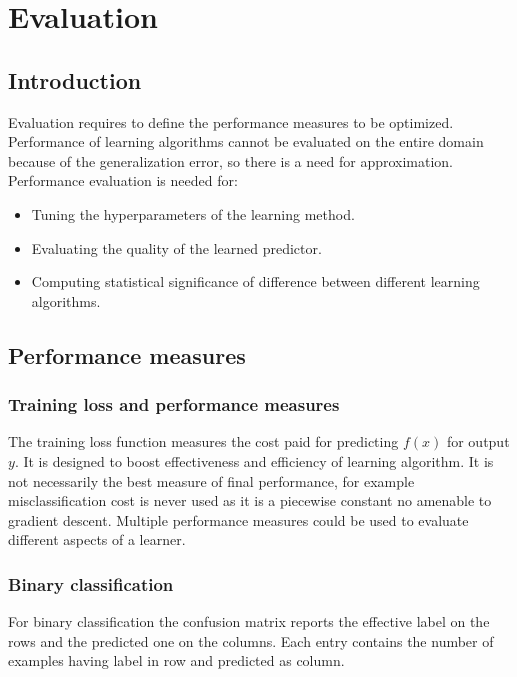 \chapter{Evaluation}

\section{Introduction}
Evaluation requires to define the performance measures to be optimized.
Performance of learning algorithms cannot be evaluated on the entire domain because of the generalization error, so there is a need for approximation.
Performance evaluation is needed for:

\begin{multicols}{2}
	\begin{itemize}
		\item Tuning the hyperparameters of the learning method.
		\item Evaluating the quality of the learned predictor.
		\item Computing statistical significance of difference between different learning algorithms.
	\end{itemize}
\end{multicols}

\section{Performance measures}

	\subsection{Training loss and performance measures}
	The training loss function measures the cost paid for predicting $f(x)$ for output $y$.
	It is designed to boost effectiveness and efficiency of learning algorithm.
	It is not necessarily the best measure of final performance, for example misclassification cost is never used as it is a piecewise constant no amenable to gradient descent.
	Multiple performance measures could be used to evaluate different aspects of a learner.

	\subsection{Binary classification}
	For binary classification the confusion matrix reports the effective label on the rows and the predicted one on the columns.
	Each entry contains the number of examples having label in row and predicted as column.
	
